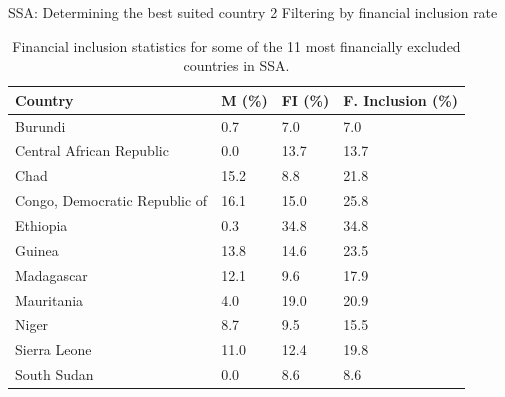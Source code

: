 \documentclass[10pt]{beamer}
\begin{document}
\begin{frame}{SSA: Determining the best suited country 2}
    \vspace{.5cm}
    Filtering by financial inclusion rate

    \begin{table}[!ht]
    \centering
    \begin{tabular}{|l|l|l|l|}
    \hline
    \textbf{Country}        & \textbf{M (\%)} & \textbf{FI (\%)} & \textbf{F. Inclusion (\%)} \\ \hline
    Burundi             & 0.7            & 7.0                      & 7.0                  \\ \hline
    Central African Republic    & 0.0            & 13.7                       & 13.7                  \\ \hline
    Chad              & 15.2             & 8.8                      & 21.8                 \\ \hline
    Congo, Democratic Republic of & 16.1             & 15.0                       & 25.8                  \\ \hline
    Ethiopia            & 0.3            & 34.8                       & 34.8                  \\ \hline
    Guinea            & 13.8             & 14.6                       & 23.5                  \\ \hline
    Madagascar          & 12.1             & 9.6                      & 17.9                  \\ \hline
    Mauritania          & 4.0            & 19.0                       & 20.9                  \\ \hline
    Niger             & 8.7            & 9.5                      & 15.5                  \\ \hline
    Sierra Leone          & 11.0             & 12.4                       & 19.8                  \\ \hline
    South Sudan           & 0.0            & 8.6                      & 8.6                  \\ \hline
    \end{tabular}
    \vspace{0.1cm}\caption{Financial inclusion statistics for some of the 11 most financially excluded countries in SSA.}
    \end{table}
\end{frame}
\end{document}

